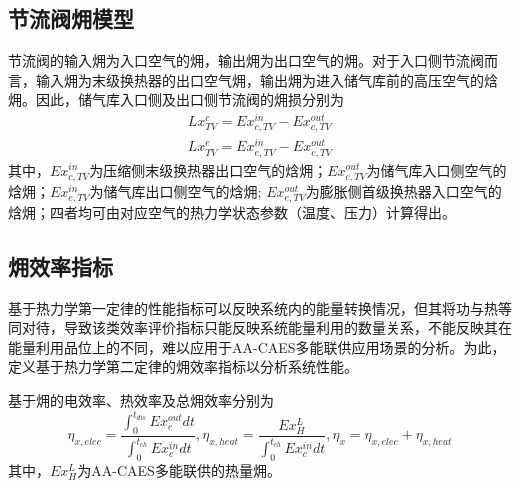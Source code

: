 \subsection{节流阀㶲模型}
 节流阀的输入㶲为入口空气的㶲，输出㶲为出口空气的㶲。对于入口侧节流阀而言，输入㶲为末级换热器的出口空气㶲，输出㶲为进入储气库前的高压空气的焓㶲。因此，储气库入口侧及出口侧节流阀的㶲损分别为
\begin{subequations}
\label{eq:exergy-TV}
\begin{gather}
Lx_{TV}^c = Ex_{c,TV}^{in} - Ex_{c,TV}^{out} \label{equ:throttle-valve-comp-exergy-loss}\\
Lx_{TV}^e = Ex_{e,TV}^{in} - Ex_{e,TV}^{out} \label{equ:throttle-valve-turb-exergy-loss}
\end{gather}
\end{subequations}
其中，$Ex_{c,TV}^{in}$为压缩侧末级换热器出口空气的焓㶲；$Ex_{c,TV}^{out}$为储气库入口侧空气的焓㶲；$Ex_{e,TV}^{in}$为储气库出口侧空气的焓㶲; $Ex_{e,TV}^{out}$为膨胀侧首级换热器入口空气的焓㶲；四者均可由对应空气的热力学状态参数（温度、压力）计算得出。



\subsection{㶲效率指标}
基于热力学第一定律的性能指标可以反映系统内的能量转换情况，但其将功与热等同对待，导致该类效率评价指标只能反映系统能量利用的数量关系，不能反映其在能量利用品位上的不同，难以应用于AA-CAES多能联供应用场景的分析。为此，定义基于热力学第二定律的㶲效率指标以分析系统性能。

基于㶲的电效率、热效率及总㶲效率分别为
\begin{equation}
{\eta _{x,elec}} = \frac{{\int_0^{{t_{dis}}} {Ex_e^{out}dt} }}{{\int_0^{{t_{ch}}} {Ex_c^{in}dt} }},{\eta _{x,heat}} = \frac{{Ex_H^L}}{{\int_0^{{t_{ch}}} {Ex_c^{in}dt} }}, {\eta _x} = {\eta _{x,elec}} + {\eta _{x,heat}}
\end{equation}
其中，${Ex_H^L}$为AA-CAES多能联供的热量㶲。

